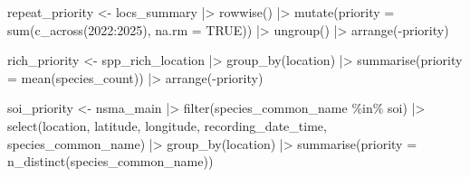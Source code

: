 \documentclass[
  letterpaper,
  DIV=11,
  numbers=noendperiod,
  oneside]{scrartcl}
\newenvironment{Shaded}{\begin{snugshade}}{\end{snugshade}}
\newcommand{\AttributeTok}[1]{\textcolor[rgb]{0.40,0.45,0.13}{#1}}
\newcommand{\ConstantTok}[1]{\textcolor[rgb]{0.56,0.35,0.01}{#1}}
\newcommand{\FunctionTok}[1]{\textcolor[rgb]{0.28,0.35,0.67}{#1}}
\newcommand{\NormalTok}[1]{\textcolor[rgb]{0.00,0.23,0.31}{#1}}
\newcommand{\OtherTok}[1]{\textcolor[rgb]{0.00,0.23,0.31}{#1}}
\newcommand{\SpecialCharTok}[1]{\textcolor[rgb]{0.37,0.37,0.37}{#1}}
\newcommand{\StringTok}[1]{\textcolor[rgb]{0.13,0.47,0.30}{#1}}
\begin{document}
\begin{Shaded}
\begin{Highlighting}[]
\NormalTok{repeat\_priority }\OtherTok{\textless{}{-}}\NormalTok{ locs\_summary }\SpecialCharTok{|\textgreater{}}
  \FunctionTok{rowwise}\NormalTok{() }\SpecialCharTok{|\textgreater{}}
  \FunctionTok{mutate}\NormalTok{(}\AttributeTok{priority =} \FunctionTok{sum}\NormalTok{(}\FunctionTok{c\_across}\NormalTok{(}\StringTok{\textasciigrave{}}\AttributeTok{2022}\StringTok{\textasciigrave{}}\SpecialCharTok{:}\StringTok{\textasciigrave{}}\AttributeTok{2025}\StringTok{\textasciigrave{}}\NormalTok{), }\AttributeTok{na.rm =} \ConstantTok{TRUE}\NormalTok{)) }\SpecialCharTok{|\textgreater{}}
  \FunctionTok{ungroup}\NormalTok{() }\SpecialCharTok{|\textgreater{}}
  \FunctionTok{arrange}\NormalTok{(}\SpecialCharTok{{-}}\NormalTok{priority)}

\NormalTok{rich\_priority }\OtherTok{\textless{}{-}}\NormalTok{ spp\_rich\_location }\SpecialCharTok{|\textgreater{}} \FunctionTok{group\_by}\NormalTok{(location) }\SpecialCharTok{|\textgreater{}} \FunctionTok{summarise}\NormalTok{(}\AttributeTok{priority =} \FunctionTok{mean}\NormalTok{(species\_count)) }\SpecialCharTok{|\textgreater{}} \FunctionTok{arrange}\NormalTok{(}\SpecialCharTok{{-}}\NormalTok{priority)}

\NormalTok{soi\_priority }\OtherTok{\textless{}{-}}\NormalTok{ nsma\_main }\SpecialCharTok{|\textgreater{}}
  \FunctionTok{filter}\NormalTok{(species\_common\_name }\SpecialCharTok{\%in\%}\NormalTok{ soi) }\SpecialCharTok{|\textgreater{}}
  \FunctionTok{select}\NormalTok{(location, latitude, longitude, recording\_date\_time, species\_common\_name)  }\SpecialCharTok{|\textgreater{}}
  \FunctionTok{group\_by}\NormalTok{(location) }\SpecialCharTok{|\textgreater{}}
  \FunctionTok{summarise}\NormalTok{(}\AttributeTok{priority =} \FunctionTok{n\_distinct}\NormalTok{(species\_common\_name))}


\end{Highlighting}
\end{Shaded}
\end{document}
